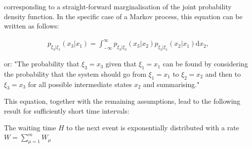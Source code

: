 \documentclass[10pt,a4paper]{article}
\begin{document}
corresponding to a straight-forward marginalisation of the joint probability density function. In the specific case of a Markov process, this equation can be written as follows:

\begin{align*}
	p_{\xi_3 | \xi_1 } \left( x_3 | x_1 \right) = \int_{-\infty}^{\infty} p_{\xi_3 | \xi_2} \left( x_3 | x_2 \right) p_{\xi_2 | \xi_1} \left( x_2 | x_1 \right)\mathrm{d}x_2,
\end{align*}

or: "The probability that $\xi_3 = x_3$ given that $\xi_1 = x_1$ can be found by considering the probability that the system should go from $\xi_1 = x_1$ to $\xi_2 = x_2$ and then to $\xi_3 = x_3$ for all possible intermediate states $x_2$ and summarising."

This equation, together with the remaining assumptions, lead to the following result for sufficiently short time intervals:

\begin{lemma} \label{lemma:exponential}
	The waiting time $H$ to the next event is exponentially distributed with a rate $W = \sum_{\mu=1}^m W_\mu$
\end{lemma}
\end{document}
